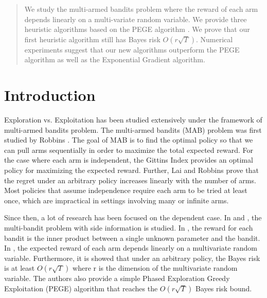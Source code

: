 \documentclass{article}
\theoremstyle{plain}
\theoremstyle{definition}
\begin{document}
 

\begin{abstract} 
We study the multi-armed bandits problem where the reward of each arm  depends linearly on a multi-variate random variable. We provide three heuristic algorithms based on the PEGE algorithm \cite{Paat}. We prove that our first heuristic algorithm still has Bayes risk $O(r\sqrt{T})$. Numerical experiments suggest that our new algorithms outperform the PEGE algorithm as well as the Exponential Gradient algorithm. 
\end{abstract} 


\section{Introduction}

Exploration vs. Exploitation has been studied extensively under the framework of multi-armed bandits problem. The multi-armed bandits (MAB) problem was first studied by Robbins \cite{Robbins}. The goal of MAB is to find the optimal policy so that we can pull arms sequentially in order to maximize the total expected reward. For the case where each arm is independent, the Gittins Index \cite{Gittins} provides an optimal policy for maximizing the expected reward. Further, Lai and Robbins \cite{Lai} prove that the regret under an arbitrary policy increases linearly with the number of arms. Most policies that assume independence require each arm to be tried at least once, which are impractical in settings involving many or infinite arms. 

Since then, a lot of research has been focused on the dependent case. In \citet{Gabor} and \citet{Chih-Chun}, the multi-bandit problem with side information is studied. In \citet{Yasin1,Yasin2} , the reward for each bandit is the inner product between a single unknown parameter and the bandit. In \citet{Paat}, the expected reward of each arm depends linearly on a multivariate random variable. Furthermore, it is showed that under an arbitrary policy, the Bayes risk is at least $O(r\sqrt{T})$ where r is the dimension of the multivariate random variable. The authors also provide a simple Phased Exploration Greedy Exploitation (PEGE) algorithm that reaches the $O(r\sqrt{T})$ Bayes risk bound.
\end{document}
